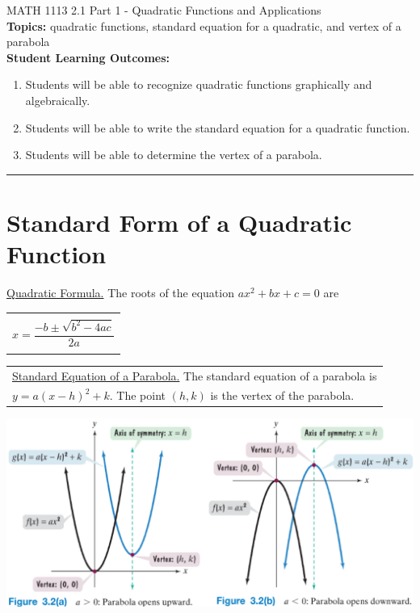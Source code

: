 \documentclass[11pt]{article}
\begin{document}
\noindent MATH 1113   \hfill 2.1 Part 1 - Quadratic Functions and Applications\\



\noindent \textbf{Topics:}  quadratic functions, standard equation for  a quadratic, and vertex of a parabola\\

\noindent \textbf{Student Learning Outcomes:}
\begin{enumerate}
\item Students will be able to recognize quadratic functions graphically and algebraically.
\item Students will be able to write the standard equation for a quadratic function.
\item Students will be able to determine the vertex of a parabola.
\end{enumerate}

\hrule 
\vspace{5mm}
\section{Standard Form of a Quadratic Function}

\noindent \underline{Quadratic Formula.} The roots of the equation $ax^2+bx+c=0$ are \begin{tabular}{| l |} \hline \\ $x = \dfrac{-b \pm \sqrt{b^2-4ac}}{2a}$  \\ \\ \hline
\end{tabular} 


\hspace{-.3in}\begin{tabular}{| l |} \hline 
\noindent \underline{Standard Equation of a Parabola.} The standard equation of a parabola is \\
$ y = a(x-h)^2 + k$. The point $(h,k)$ is the vertex of the parabola.
\\ \hline
\end{tabular} 

\includegraphics[scale=.7]{graphstandard}
\end{document}
